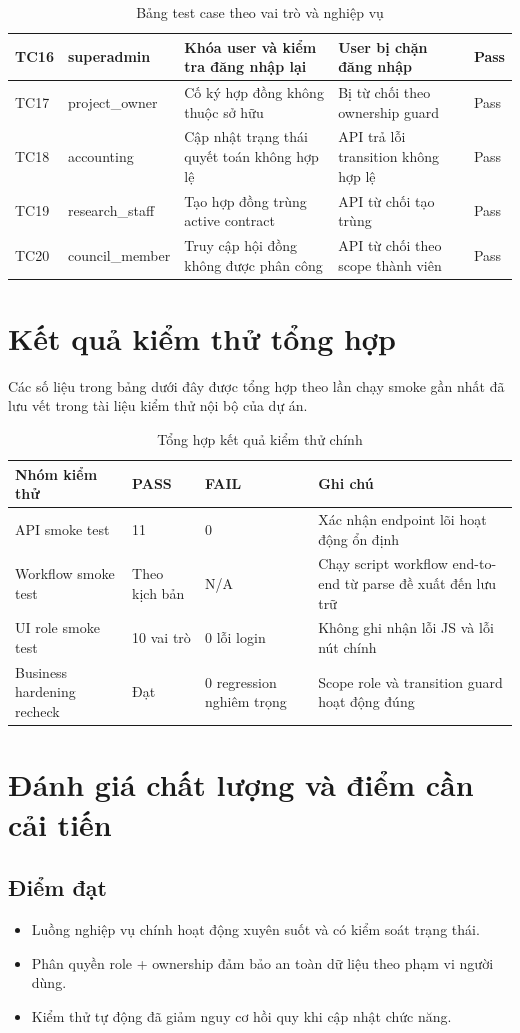 \documentclass[12pt,a4paper]{report}
\begin{document}
\begin{table}[H]
\begin{tabular}{|L{1.3cm}|L{2.3cm}|L{3.8cm}|L{3.4cm}|L{2.7cm}|}
TC16 & superadmin & Khóa user và kiểm tra đăng nhập lại & User bị chặn đăng nhập & Pass \\ \hline
TC17 & project\_owner & Cố ký hợp đồng không thuộc sở hữu & Bị từ chối theo ownership guard & Pass \\ \hline
TC18 & accounting & Cập nhật trạng thái quyết toán không hợp lệ & API trả lỗi transition không hợp lệ & Pass \\ \hline
TC19 & research\_staff & Tạo hợp đồng trùng active contract & API từ chối tạo trùng & Pass \\ \hline
TC20 & council\_member & Truy cập hội đồng không được phân công & API từ chối theo scope thành viên & Pass \\ \hline
\end{tabular}
\caption{Bảng test case theo vai trò và nghiệp vụ}
\end{table}

\section{Kết quả kiểm thử tổng hợp}
Các số liệu trong bảng dưới đây được tổng hợp theo lần chạy smoke gần nhất đã lưu vết trong tài liệu kiểm thử nội bộ của dự án.

\begin{table}[H]
\centering
\begin{tabular}{|L{3.6cm}|L{2.6cm}|L{2.6cm}|L{4.0cm}|}
\hline
\textbf{Nhóm kiểm thử} & \textbf{PASS} & \textbf{FAIL} & \textbf{Ghi chú} \\ \hline
API smoke test & 11 & 0 & Xác nhận endpoint lõi hoạt động ổn định \\ \hline
Workflow smoke test & Theo kịch bản & N/A & Chạy script workflow end-to-end từ parse đề xuất đến lưu trữ \\ \hline
UI role smoke test & 10 vai trò & 0 lỗi login & Không ghi nhận lỗi JS và lỗi nút chính \\ \hline
Business hardening recheck & Đạt & 0 regression nghiêm trọng & Scope role và transition guard hoạt động đúng \\ \hline
\end{tabular}
\caption{Tổng hợp kết quả kiểm thử chính}
\end{table}

\section{Đánh giá chất lượng và điểm cần cải tiến}
\subsection{Điểm đạt}
\begin{itemize}[leftmargin=1.2cm]
\item Luồng nghiệp vụ chính hoạt động xuyên suốt và có kiểm soát trạng thái.
\item Phân quyền role + ownership đảm bảo an toàn dữ liệu theo phạm vi người dùng.
\item Kiểm thử tự động đã giảm nguy cơ hồi quy khi cập nhật chức năng.
\end{itemize}
\end{document}
